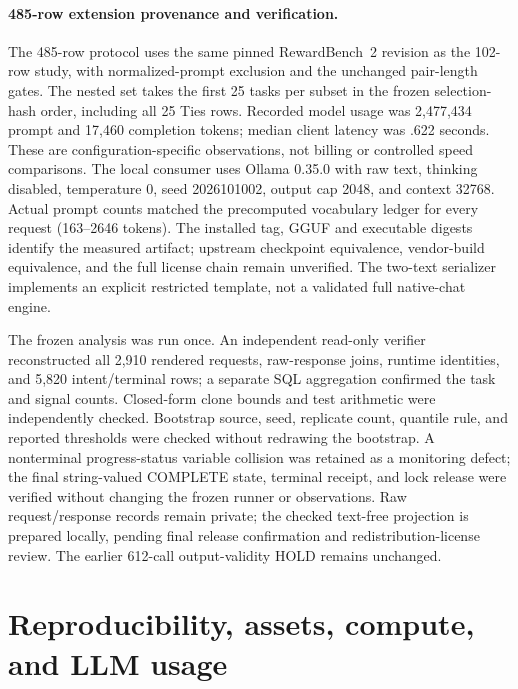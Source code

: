 \documentclass[10pt]{article}
\begin{document}
\paragraph{485-row extension provenance and verification.}
The 485-row protocol uses the same pinned RewardBench~2 revision as the 102-row study, with normalized-prompt exclusion and the unchanged pair-length gates. The nested set takes the first 25 tasks per subset in the frozen selection-hash order, including all 25 Ties rows. Recorded model usage was 2,477,434 prompt and 17,460 completion tokens; median client latency was .622 seconds. These are configuration-specific observations, not billing or controlled speed comparisons. The local consumer uses Ollama 0.35.0 with raw text, thinking disabled, temperature 0, seed 2026101002, output cap 2048, and context 32768. Actual prompt counts matched the precomputed vocabulary ledger for every request (163--2646 tokens). The installed tag, GGUF and executable digests identify the measured artifact; upstream checkpoint equivalence, vendor-build equivalence, and the full license chain remain unverified. The two-text serializer implements an explicit restricted template, not a validated full native-chat engine.

The frozen analysis was run once. An independent read-only verifier reconstructed all 2,910 rendered requests, raw-response joins, runtime identities, and 5,820 intent/terminal rows; a separate SQL aggregation confirmed the task and signal counts. Closed-form clone bounds and test arithmetic were independently checked. Bootstrap source, seed, replicate count, quantile rule, and reported thresholds were checked without redrawing the bootstrap. A nonterminal progress-status variable collision was retained as a monitoring defect; the final string-valued COMPLETE state, terminal receipt, and lock release were verified without changing the frozen runner or observations. Raw request/response records remain private; the checked text-free projection is prepared locally, pending final release confirmation and redistribution-license review. The earlier 612-call output-validity HOLD remains unchanged.

\section{Reproducibility, assets, compute, and LLM usage}
\end{document}
